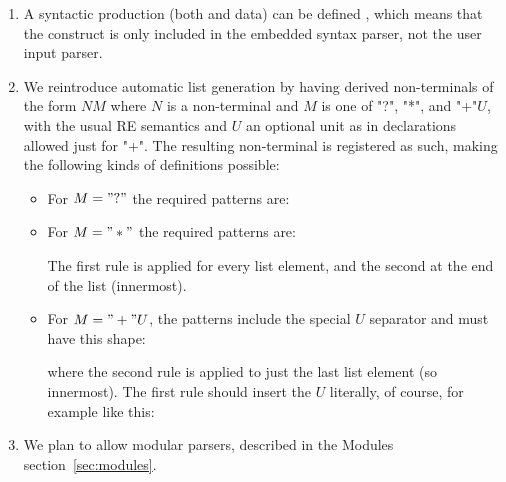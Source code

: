 \documentclass[11pt]{article} %
\begin{document}
\begin{enumerate}

\item A syntactic production (both  and data) can be defined , which means
  that the construct is only included in the embedded syntax parser, not the user input parser.

\item We reintroduce automatic list generation by having derived non-terminals of the form $NM$
  where $N$ is a non-terminal and $M$ is one of "?", "*", and "+"$U$, with the usual RE semantics
  and $U$ an optional unit as in  declarations allowed just for "+". The resulting
  non-terminal is registered as such, making the following kinds of definitions possible:
  \begin{itemize}

  \item For $M="?"$ the required patterns are:

  \item For $M="*"$ the required patterns are:
    The first rule is applied for every list element, and the second at the end of the list
    (innermost).

  \item For $M="+"U$, the patterns include the special $U$ separator and must have this shape:
    where the second rule is applied to just the last list element (so innermost). The first rule
    should insert the $U$ literally, of course, for example like this:

  \end{itemize}

\item We plan to allow modular parsers, described in the Modules section~\ref{sec:modules}.
\end{enumerate}
\end{document}
